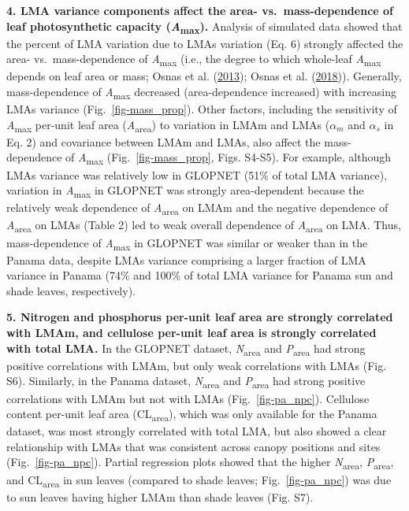 \documentclass[
  12pt,
  letterpaper,
  DIV=11,
  numbers=noendperiod]{scrartcl}
\begin{document}
\textbf{4. LMA variance components affect the area- vs.~mass-dependence
of leaf photosynthetic capacity (\emph{A}\textsubscript{max}).} Analysis
of simulated data showed that the percent of LMA variation due to LMAs
variation (Eq. 6) strongly affected the area- vs.~mass-dependence of
\emph{A}\textsubscript{max} (i.e., the degree to which whole-leaf
\emph{A}\textsubscript{max} depends on leaf area or mass; Osnas et al.
(\protect\hyperlink{ref-Osnas2013}{2013}); Osnas et al.
(\protect\hyperlink{ref-Osnas2018}{2018})). Generally, mass-dependence
of \emph{A}\textsubscript{max} decreased (area-dependence increased)
with increasing LMAs variance (Fig.~\ref{fig-mass_prop}). Other factors,
including the sensitivity of \emph{A}\textsubscript{max} per-unit leaf
area (\emph{A}\textsubscript{area}) to variation in LMAm and LMAs
(\(\alpha_m\) and \(\alpha_s\) in Eq. 2) and covariance between LMAm and
LMAs, also affect the mass-dependence of \emph{A}\textsubscript{max}
(Fig.~\ref{fig-mass_prop}, Figs. S4-S5). For example, although LMAs
variance was relatively low in GLOPNET (51\% of total LMA variance),
variation in \emph{A}\textsubscript{max} in GLOPNET was strongly
area-dependent because the relatively weak dependence of
\emph{A}\textsubscript{area} on LMAm and the negative dependence of
\emph{A}\textsubscript{area} on LMAs (Table 2) led to weak overall
dependence of \emph{A}\textsubscript{area} on LMA. Thus, mass-dependence
of \emph{A}\textsubscript{max} in GLOPNET was similar or weaker than in
the Panama data, despite LMAs variance comprising a larger fraction of
LMA variance in Panama (74\% and 100\% of total LMA variance for Panama
sun and shade leaves, respectively).

\textbf{5. Nitrogen and phosphorus per-unit leaf area are strongly
correlated with LMAm, and cellulose per-unit leaf area is strongly
correlated with total LMA.} In the GLOPNET dataset,
\emph{N}\textsubscript{area} and \emph{P}\textsubscript{area} had strong
positive correlations with LMAm, but only weak correlations with LMAs
(Fig. S6). Similarly, in the Panama dataset,
\emph{N}\textsubscript{area} and \emph{P}\textsubscript{area} had strong
positive correlations with LMAm but not with LMAs
(Fig.~\ref{fig-pa_npc}). Cellulose content per-unit leaf area
(CL\textsubscript{area}), which was only available for the Panama
dataset, was most strongly correlated with total LMA, but also showed a
clear relationship with LMAs that was consistent across canopy positions
and sites (Fig.~\ref{fig-pa_npc}). Partial regression plots showed that
the higher \emph{N}\textsubscript{area}, \emph{P}\textsubscript{area},
and CL\textsubscript{area} in sun leaves (compared to shade leaves;
Fig.~\ref{fig-pa_npc}) was due to sun leaves having higher LMAm than
shade leaves (Fig. S7).
\end{document}
